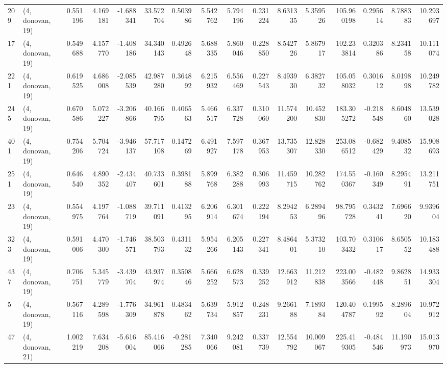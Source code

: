 \begin{tabular}{llrrrrrrrrrrrrrr}
209 &  (4, donovan, 19) &   0.551196 &   4.169181 &  -1.688341 &    33.572704 &   0.503986 &   5.542762 &   5.794196 &  0.231224 &   8.631335 &   5.359526 &   105.960198 &  0.295614 &   8.788383 &  10.293697 \\
17  &  (4, donovan, 19) &   0.549688 &   4.157770 &  -1.408186 &    34.340143 &   0.492648 &   5.688335 &   5.860046 &  0.228850 &   8.542726 &   5.867917 &   102.233814 &  0.320386 &   8.234158 &  10.111074 \\
221 &  (4, donovan, 19) &   0.619525 &   4.686008 &  -2.085539 &    42.987280 &   0.364892 &   6.215932 &   6.556469 &  0.227543 &   8.493930 &   6.382732 &   105.058032 &  0.301612 &   8.019898 &  10.249782 \\
245 &  (4, donovan, 19) &   0.670586 &   5.072227 &  -3.206866 &    40.166795 &   0.406563 &   5.466517 &   6.337728 &  0.310060 &  11.574200 &  10.452830 &   183.305272 & -0.218548 &   8.604860 &  13.539028 \\
401 &  (4, donovan, 19) &   0.754206 &   5.704724 &  -3.946137 &    57.717108 &   0.147269 &   6.491927 &   7.597178 &  0.367953 &  13.735307 &  12.828330 &   253.086512 & -0.682429 &   9.408532 &  15.908693 \\
251 &  (4, donovan, 19) &   0.646540 &   4.890352 &  -2.434407 &    40.733601 &   0.398188 &   5.899768 &   6.382288 &  0.306993 &  11.459715 &  10.282762 &   174.550367 & -0.160349 &   8.295491 &  13.211751 \\
23  &  (4, donovan, 19) &   0.554975 &   4.197764 &  -1.088719 &    39.711091 &   0.413295 &   6.206914 &   6.301674 &  0.222194 &   8.294253 &   6.289496 &    98.795728 &  0.343241 &   7.696620 &   9.939604 \\
323 &  (4, donovan, 19) &   0.591006 &   4.470300 &  -1.746571 &    38.503793 &   0.431132 &   5.954266 &   6.205143 &  0.227341 &   8.486401 &   5.373210 &   103.703432 &  0.310617 &   8.650552 &  10.183488 \\
437 &  (4, donovan, 19) &   0.706751 &   5.345779 &  -3.439704 &    43.937974 &   0.350846 &   5.666252 &   6.628573 &  0.339252 &  12.663912 &  11.212838 &   223.003566 & -0.482448 &   9.862851 &  14.933304 \\
5   &  (4, donovan, 19) &   0.567116 &   4.289598 &  -1.776309 &    34.961878 &   0.483462 &   5.639734 &   5.912857 &  0.248231 &   9.266188 &   7.189384 &   120.404787 &  0.199592 &   8.289604 &  10.972912 \\
47  &  (4, donovan, 21) &   1.002219 &   7.634208 &  -5.616004 &    85.416066 &  -0.281285 &   7.340066 &   9.242081 &  0.337739 &  12.554792 &  10.009067 &   225.419305 & -0.484546 &  11.190973 &  15.013970 \\

\end{tabular}
